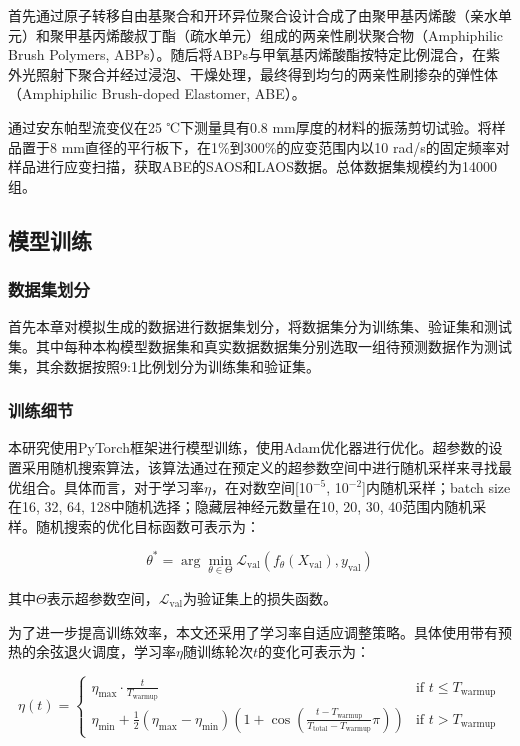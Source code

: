 首先通过原子转移自由基聚合和开环异位聚合设计合成了由聚甲基丙烯酸（亲水单元）和聚甲基丙烯酸叔丁酯（疏水单元）组成的两亲性刷状聚合物（Amphiphilic Brush Polymers, ABPs）。随后将ABPs与甲氧基丙烯酸酯按特定比例混合，在紫外光照射下聚合并经过浸泡、干燥处理，最终得到均匀的两亲性刷掺杂的弹性体（Amphiphilic Brush-doped Elastomer, ABE）。

通过安东帕型流变仪在25 ℃下测量具有0.8 mm厚度的材料的振荡剪切试验。将样品置于8 mm直径的平行板下，在1\%到300\%的应变范围内以10 rad/s的固定频率对样品进行应变扫描，获取ABE的SAOS和LAOS数据。总体数据集规模约为14000组。
\subsection{模型训练}
\subsubsection{数据集划分}
首先本章对模拟生成的数据进行数据集划分，将数据集分为训练集、验证集和测试集。其中每种本构模型数据集和真实数据数据集分别选取一组待预测数据作为测试集，其余数据按照9:1比例划分为训练集和验证集。

\subsubsection{训练细节} \label{sec:training method}
本研究使用PyTorch框架进行模型训练，使用Adam优化器进行优化。超参数的设置采用随机搜索算法，该算法通过在预定义的超参数空间中进行随机采样来寻找最优组合。具体而言，对于学习率$\eta$，在对数空间[10$^{-5}$, 10$^{-2}$]内随机采样；batch size在{16, 32, 64, 128}中随机选择；隐藏层神经元数量在{10, 20, 30, 40}范围内随机采样。随机搜索的优化目标函数可表示为：

\begin{equation}
  \theta^* = \arg \min_{\theta \in \Theta} \mathcal{L}_{\text{val}}(f_\theta(X_{\text{val}}), y_{\text{val}})
\end{equation}

其中$\Theta$表示超参数空间，$\mathcal{L}_{\text{val}}$为验证集上的损失函数。

为了进一步提高训练效率，本文还采用了学习率自适应调整策略。具体使用带有预热的余弦退火调度，学习率$\eta$随训练轮次$t$的变化可表示为：

\begin{equation}
  \eta(t) = \begin{cases}
    \eta_{\text{max}} \cdot \frac{t}{T_{\text{warmup}}}                                                                                             & \text{if } t \leq T_{\text{warmup}} \\
    \eta_{\text{min}} + \frac{1}{2}(\eta_{\text{max}}-\eta_{\text{min}})(1+\cos(\frac{t-T_{\text{warmup}}}{T_{\text{total}}-T_{\text{warmup}}}\pi)) & \text{if } t > T_{\text{warmup}}
  \end{cases}
\end{equation}

